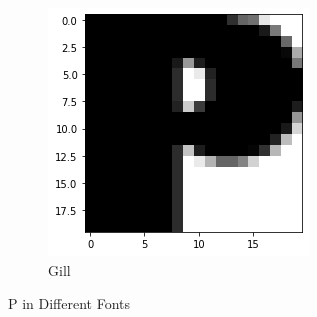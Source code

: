\documentclass{homework}
\begin{document}
\begin{figure}[H]
\medskip
\begin{subfigure}{0.4\textwidth}
\includegraphics[width=\linewidth]{gill_p.png}
\caption{Gill} \label{fig:e}
\end{subfigure}\hspace*{\fill}
\caption{P in Different Fonts}
\label{image_ex}
\end{figure}
\end{document}
